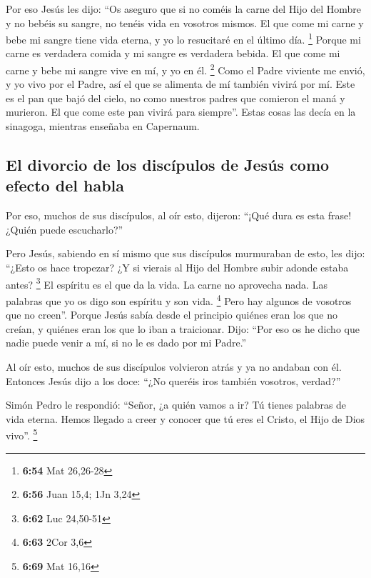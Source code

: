 \begin{paracol}{2}
 Por eso Jesús les dijo: ``Os aseguro que si no coméis la
carne del Hijo del Hombre y no bebéis su sangre, no tenéis vida en
vosotros mismos.  El que come mi carne y bebe mi sangre
tiene vida eterna, y yo lo resucitaré en el último día. \footnote{\textbf{6:54}
  Mat 26,26-28}  Porque mi carne es verdadera comida y mi
sangre es verdadera bebida.  El que come mi carne y bebe
mi sangre vive en mí, y yo en él. \footnote{\textbf{6:56} Juan 15,4; 1Jn
  3,24}  Como el Padre viviente me envió, y yo vivo por
el Padre, así el que se alimenta de mí también vivirá por mí.
 Este es el pan que bajó del cielo, no como nuestros
padres que comieron el maná y murieron. El que come este pan vivirá para
siempre''.  Estas cosas las decía en la sinagoga,
mientras enseñaba en Capernaum.

\hypertarget{el-divorcio-de-los-discuxedpulos-de-jesuxfas-como-efecto-del-habla}{%
\subsection{El divorcio de los discípulos de Jesús como efecto del
habla}\label{el-divorcio-de-los-discuxedpulos-de-jesuxfas-como-efecto-del-habla}}

 Por eso, muchos de sus discípulos, al oír esto, dijeron:
``¡Qué dura es esta frase! ¿Quién puede escucharlo?''

 Pero Jesús, sabiendo en sí mismo que sus discípulos
murmuraban de esto, les dijo: ``¿Esto os hace tropezar? 
¿Y si vierais al Hijo del Hombre subir adonde estaba antes? \footnote{\textbf{6:62}
  Luc 24,50-51}  El espíritu es el que da la vida. La
carne no aprovecha nada. Las palabras que yo os digo son espíritu y son
vida. \footnote{\textbf{6:63} 2Cor 3,6}  Pero hay algunos
de vosotros que no creen''. Porque Jesús sabía desde el principio
quiénes eran los que no creían, y quiénes eran los que lo iban a
traicionar.  Dijo: ``Por eso os he dicho que nadie puede
venir a mí, si no le es dado por mi Padre.''

 Al oír esto, muchos de sus discípulos volvieron atrás y
ya no andaban con él.  Entonces Jesús dijo a los doce:
``¿No queréis iros también vosotros, verdad?''

 Simón Pedro le respondió: ``Señor, ¿a quién vamos a ir?
Tú tienes palabras de vida eterna.  Hemos llegado a creer
y conocer que tú eres el Cristo, el Hijo de Dios vivo''. \footnote{\textbf{6:69}
  Mat 16,16}


\end{paracol}
